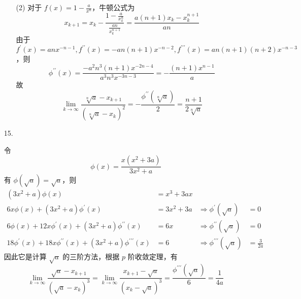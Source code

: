 \documentclass{sjtuarticle}
\begin{document}
\begin{itemize}
\begin{solution}
\begin{itemize}
\begin{equation*}
            \end{equation*}
            \item[(2)] 对于 $f(x)=1-\frac{a}{x^n}$，牛顿公式为
            \begin{equation*}
                x_{k+1}=x_k-\frac{1-\frac{a}{x_k^n}}{\frac{an}{x_k^{n+1}}}=\frac{a(n+1)x_k-x_k^{n+1}}{an}
            \end{equation*}
            由于 $f^\prime(x)=anx^{-n-1},f^{\prime\prime}(x)=-an(n+1)x^{-n-2},f^{\prime\prime\prime}(x)=an(n+1)(n+2)x^{-n-3}$，则
            \begin{equation*}
                \phi^{\prime\prime}(x)=\frac{-a^2n^3(n+1)x^{-2n-4}}{a^3n^3x^{-3n-3}}=-\frac{(n+1)x^{n-1}}{a}
            \end{equation*}
            故
            \begin{equation*}
                \lim_{k\rightarrow \infty}\frac{\sqrt[n]{a}-x_{k+1}}{(\sqrt[n]{a}-x_k)^2}=-\frac{\phi^{\prime\prime}(\sqrt[n]{a})}{2}=\frac{n+1}{2\sqrt[n]{a}}
            \end{equation*}
        \end{itemize}
    \end{solution}
    \item[15.] \begin{solution}
        令
        \begin{equation*}
            \phi(x)=\frac{x(x^2+3a)}{3x^2+a}
        \end{equation*}
        有 $\phi(\sqrt{a})=\sqrt{a}$，则
        \begin{align*}
            (3x^2+a)\phi(x)&=x^3+3ax\\
            6x\phi(x)+(3x^2+a)\phi^\prime(x)&=3x^2+3a&\Rightarrow \phi^\prime(\sqrt{a})&=0\\
            6\phi(x)+12x\phi^\prime(x)+(3x^2+a)\phi^{\prime\prime}(x)&=6x&\Rightarrow \phi^{\prime\prime}(\sqrt{a})&=0\\
            18\phi^\prime(x)+18x\phi^{\prime\prime}(x)+(3x^2+a)\phi^{\prime\prime\prime}(x)&=6&\Rightarrow \phi^{\prime\prime\prime}(\sqrt{a})&=\frac{3}{2a}
        \end{align*}
        因此它是计算 $\sqrt{a}$ 的三阶方法，根据 $p$ 阶收敛定理，有
        \begin{equation*}
            \lim_{k\rightarrow \infty}\frac{\sqrt{a}-x_{k+1}}{(\sqrt{a}-x_k)^3}=\lim_{k\rightarrow \infty}\frac{x_{k+1}-\sqrt{a}}{(x_k-\sqrt{a})^3}=\frac{\phi^{\prime\prime\prime}(\sqrt{a})}{6}=\frac{1}{4a}
        \end{equation*}
    \end{solution}
\end{itemize}
\end{document}
